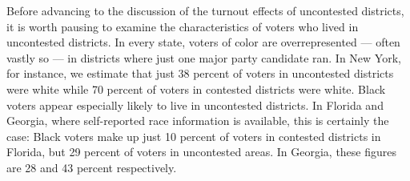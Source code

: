 \documentclass[
  12pt,
]{article}
\begin{document}
\begin{table}[H]

\caption{\label{tab:wi-match-table}\label{tab:wi-match} Results of Wisconsin Matching}
\centering
{}
\end{table}

Before advancing to the discussion of the turnout effects of uncontested districts, it is worth pausing to examine the characteristics of voters who lived in uncontested districts. In every state, voters of color are overrepresented --- often vastly so --- in districts where just one major party candidate ran. In New York, for instance, we estimate that just 38 percent of voters in uncontested districts were white while 70 percent of voters in contested districts were white. Black voters appear especially likely to live in uncontested districts. In Florida and Georgia, where self-reported race information is available, this is certainly the case: Black voters make up just 10 percent of voters in contested districts in Florida, but 29 percent of voters in uncontested areas. In Georgia, these figures are 28 and 43 percent respectively.
\end{document}
